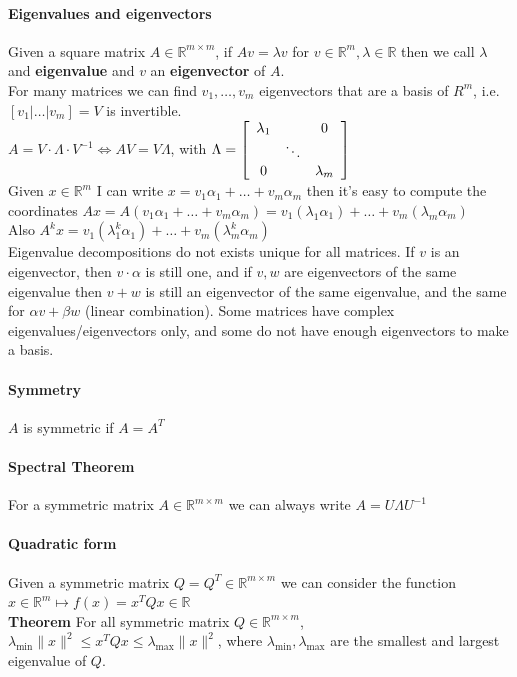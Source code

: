 \documentclass[10pt]{report}
\begin{document}
\paragraph{Eigenvalues and eigenvectors} Given a square matrix $A\in \mathbb{R}^{m\times m}$, if $Av = \lambda v$ for $v\in \mathbb{R}^m, \lambda\in \mathbb{R}$ then we call $\lambda$ and \textbf{eigenvalue} and $v$ an \textbf{eigenvector} of $A$.\\
For many matrices we can find $v_1,\ldots,v_m$ eigenvectors that are a basis of $R^m$, i.e. $[v_1|\ldots|v_m] = V$ is invertible.\\
$A = V\cdot\Lambda\cdot V^{-1}\Leftrightarrow AV = V\Lambda$, with $\Lambda = \left[\begin{array}{c c c}
\lambda_1 & & 0\\
& \ddots \\
0& & \lambda_m
\end{array}\right]$\\
Given $x\in \mathbb{R}^m$ I can write $x = v_1\alpha_1 + \ldots + v_m\alpha_m$ then it's easy to compute the coordinates $Ax = A(v_1\alpha_1 + \ldots + v_m\alpha_m) = v_1(\lambda_1\alpha_1) + \ldots + v_m(\lambda_m\alpha_m)$\\
Also $A^kx = v_1(\lambda_1^k\alpha_1) + \ldots + v_m(\lambda_m^k\alpha_m)$\\
Eigenvalue decompositions do not exists unique for all matrices. If $v$ is an eigenvector, then $v\cdot\alpha$ is still one, and if $v,w$ are eigenvectors of the same eigenvalue then $v+w$ is still an eigenvector of the same eigenvalue, and the same for $\alpha v+\beta w$ (linear combination). Some matrices have complex eigenvalues/eigenvectors only, and some do not have enough eigenvectors to make a basis.
\paragraph{Symmetry} $A$ is symmetric if $A = A^T$
\paragraph{Spectral Theorem} For a symmetric matrix $A\in \mathbb{R}^{m\times m}$ we can always write $A = U\Lambda U^{-1}$
\paragraph{Quadratic form} Given a symmetric matrix $Q = Q^T \in \mathbb{R}^{m\times m}$ we can consider the function $x\in \mathbb{R}^m\mapsto f(x) = x^T Qx \in \mathbb{R}$\\
\textbf{Theorem} For all symmetric matrix $Q \in \mathbb{R}^{m\times m}$, $\lambda_{\min}\|x\|^2 \leq x^TQx\leq \lambda_{\max}\|x\|^2$, where $\lambda_{\min}, \lambda_{\max}$ are the smallest and largest eigenvalue of $Q$.
\end{document}
